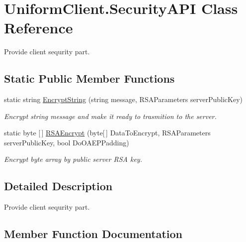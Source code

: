\hypertarget{class_uniform_client_1_1_security_a_p_i}{}\section{Uniform\+Client.\+Security\+A\+PI Class Reference}
\label{class_uniform_client_1_1_security_a_p_i}


Provide client sequrity part.  


\subsection*{Static Public Member Functions}
\begin{DoxyCompactItemize}
\item 
static string \mbox{\hyperlink{class_uniform_client_1_1_security_a_p_i_a9067bf06fedba68934b88fdac3f2ca61}{Encrypt\+String}} (string message, R\+S\+A\+Parameters server\+Public\+Key)
\begin{DoxyCompactList}\small\item\em Encrypt string message and make it ready to trasmition to the server. \end{DoxyCompactList}\item 
static byte \mbox{[}$\,$\mbox{]} \mbox{\hyperlink{class_uniform_client_1_1_security_a_p_i_ae6f06f76d98654dd1362e09ca36039c6}{R\+S\+A\+Encrypt}} (byte\mbox{[}$\,$\mbox{]} Data\+To\+Encrypt, R\+S\+A\+Parameters server\+Public\+Key, bool Do\+O\+A\+E\+P\+Padding)
\begin{DoxyCompactList}\small\item\em Encrypt byte array by public server R\+SA key. \end{DoxyCompactList}\end{DoxyCompactItemize}


\subsection{Detailed Description}
Provide client sequrity part. 



\subsection{Member Function Documentation}
\mbox{\label{class_uniform_client_1_1_security_a_p_i_a9067bf06fedba68934b88fdac3f2ca61}} 
